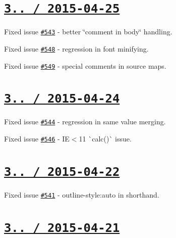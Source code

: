 \section*{\href{https://github.com/jakubpawlowicz/clean-css/compare/v3.2.4...v3.2.5}{\tt 3.. / 2015-\/04-\/25} }


\begin{DoxyItemize}
\item Fixed issue \href{https://github.com/jakubpawlowicz/clean-css/issues/543}{\tt \#543} -\/ better \char`\"{}comment in body\char`\"{} handling.
\item Fixed issue \href{https://github.com/jakubpawlowicz/clean-css/issues/548}{\tt \#548} -\/ regression in font minifying.
\item Fixed issue \href{https://github.com/jakubpawlowicz/clean-css/issues/549}{\tt \#549} -\/ special comments in source maps.
\end{DoxyItemize}

\section*{\href{https://github.com/jakubpawlowicz/clean-css/compare/v3.2.3...v3.2.4}{\tt 3.. / 2015-\/04-\/24} }


\begin{DoxyItemize}
\item Fixed issue \href{https://github.com/jakubpawlowicz/clean-css/issues/544}{\tt \#544} -\/ regression in same value merging.
\item Fixed issue \href{https://github.com/jakubpawlowicz/clean-css/issues/546}{\tt \#546} -\/ IE$<$11 \`{}calc()\`{} issue.
\end{DoxyItemize}

\section*{\href{https://github.com/jakubpawlowicz/clean-css/compare/v3.2.2...v3.2.3}{\tt 3.. / 2015-\/04-\/22} }


\begin{DoxyItemize}
\item Fixed issue \href{https://github.com/jakubpawlowicz/clean-css/issues/541}{\tt \#541} -\/ {\ttfamily outline-\/style\+:auto} in shorthand.
\end{DoxyItemize}

\section*{\href{https://github.com/jakubpawlowicz/clean-css/compare/v3.2.1...v3.2.2}{\tt 3.. / 2015-\/04-\/21} }


